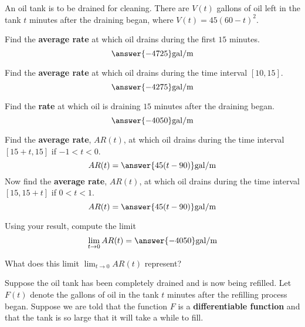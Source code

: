 \documentclass{ximera}
\begin{document}
An oil tank is to be drained for cleaning. There are $V(t)$ gallons of oil left in the tank $t$ minutes after the draining began, where $V(t)=45(60-t)^2$.
\begin{exercise}
Find the \textbf{average rate} at which oil drains during the first $15$ minutes. 
\[
\answer{-4725}\mathrm{gal/m}
\]
\begin{exercise}
Find the \textbf{average rate} at which oil drains during the time interval $[10,15]$. 
\[
\answer{-4275}\mathrm{gal/m}
\]
\begin{exercise}
Find the \textbf{rate} at which oil is draining $15$ minutes after the draining began.
\[
\answer{-4050}\mathrm{gal/m}
\]
\begin{exercise}
Find the \textbf{average rate}, $AR(t)$, at which oil drains during the time interval $[15+ t,15]$ if $-1< t<0$. 
\[
AR(t)=\answer{45(t-90)}\mathrm{gal/m}
\]
Now find the \textbf{average rate}, $AR( t)$, at which oil drains during the time interval $[15,15+ t]$ if $0< t<1$. 
\[
AR(t)=\answer{45(t-90)}\mathrm{gal/m}
\]
\begin{exercise}
Using your result, compute the limit
\[
\lim_{t\to 0}AR(t)=\answer{-4050}\mathrm{gal/m}
\]
\begin{exercise}
What does this limit $\lim_{t\to 0}AR(t)$ represent?
\begin{multipleChoice}
\end{multipleChoice}
\begin{exercise}
Suppose the oil tank has been completely drained and is now being refilled. Let $F(t)$ denote the gallons of oil in the tank $t$ minutes after the refilling process began. Suppose we are told that the function $F$ is a \textbf{differentiable function} and that the tank is so large that it will take a while to fill. 


\end{exercise}
\end{exercise}
\end{exercise}
\end{exercise}
\end{exercise}
\end{exercise}
\end{exercise}
\end{document}
